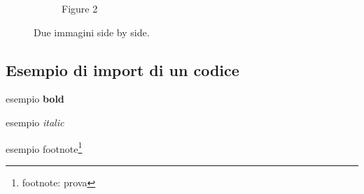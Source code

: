 \begin{figure}[h]
\begin{subfigure}{0.4\textwidth}
                \caption{Figure 2}
                \label{fig:second_image}
            \end{subfigure}
            \caption{Due immagini side by side.}
            \label{fig:both_figures}
        \end{figure}

    \subsection{Esempio di import di un codice}


esempio \textbf{bold}


esempio \textit{italic}

esempio footnote\footnote{footnote: prova}